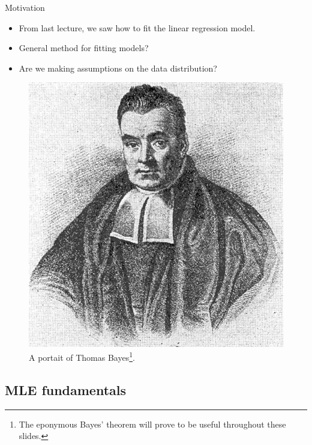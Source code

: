 \documentclass{beamer}
\numberwithin{equation}{section}
\begin{document}
\begin{frame}{Motivation}
    \begin{itemize}
        \item
        From last lecture, we saw how to fit the linear regression model.

        \item
        General method for fitting models?

        \item
        Are we making assumptions on the data distribution?
    \end{itemize}
    \begin{figure}[h!]
        \centering
        \includegraphics[scale = 0.18]{thomas_bayes.jpg}
        \caption{
            A portait of Thomas Bayes\footnote{
                The eponymous Bayes' theorem will prove to be useful
                throughout these slides.
            }.
        }
        \label{thomas_bayes}
    \end{figure}
\end{frame}

\subsection{MLE fundamentals}
\end{document}
